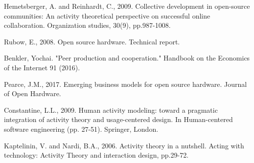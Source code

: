 Hemetsberger, A. and Reinhardt, C., 2009. Collective development in open-source communities: An activity theoretical perspective on successful online collaboration. Organization studies, 30(9), pp.987-1008.


Rubow, E., 2008. Open source hardware. Technical report.

Benkler, Yochai. "Peer production and cooperation." Handbook on the Economics of the Internet 91 (2016).

Pearce, J.M., 2017. Emerging business models for open source hardware. Journal of Open Hardware.

Constantine, L.L., 2009. Human activity modeling: toward a pragmatic integration of activity theory and usage-centered design. In Human-centered software engineering (pp. 27-51). Springer, London.

Kaptelinin, V. and Nardi, B.A., 2006. Activity theory in a nutshell. Acting with technology: Activity Theory and interaction design, pp.29-72.
